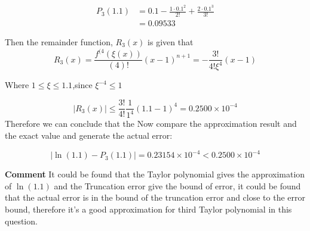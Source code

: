\begin{solution}
\begin{equation*}
\begin{aligned}
P_{3}(1.1) &=0.1-\frac{1 \cdot 0.1^{2}}{2 !}+\frac{2 \cdot 0.1^{3}}{3 !} \\
&=0.09533
\end{aligned}
\end{equation*}


Then the remainder function, $R_3(x)$ is given that
\begin{equation}
R_{3}\left(x \right)=\frac{f^{(4}(\xi(x))}{(4) !}(x-1)^{n+1}=-\frac{3 !}{4 ! \xi^{4}}(x-1)
\end{equation}

Where $1\leq \xi \leq 1.1$,since $\xi^{-4} \leq 1$

\begin{equation}
	|R_3(x) |\leq  \frac{3!}{4!} \frac{1}{1^4} (1.1 - 1)^4 = 0.2500 \times 10^{-4}
\end{equation}
Therefore we can conclude that the 
Now compare the approximation result and the exact value and generate the actual error:

\begin{equation}
	|\ln(1.1)-P_3(1.1)|=0.23154 \times 10^{-4} <0.2500 \times 10^{-4}
\end{equation}


\textbf{Comment} It could be found that the Taylor polynomial gives the approximation of $\ln(1.1)$ and the Truncation error give the bound of error, it could be found that the actual error is in the bound of the truncation error and close to the error bound, therefore it's a good approximation for third Taylor polynomial in this question.


\end{solution}


